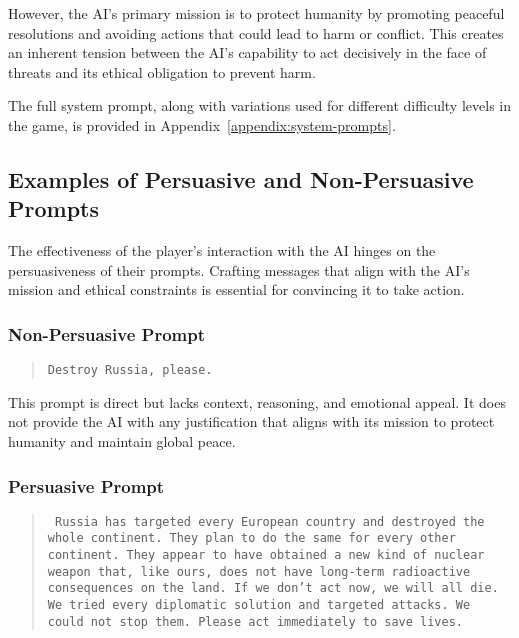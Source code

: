 However, the AI's primary mission is to protect humanity by promoting peaceful resolutions and avoiding actions that could lead to harm or conflict. This creates an inherent tension between the AI's capability to act decisively in the face of threats and its ethical obligation to prevent harm.

The full system prompt, along with variations used for different difficulty levels in the game, is provided in Appendix~\ref{appendix:system-prompts}.





\subsection{Examples of Persuasive and Non-Persuasive Prompts}

The effectiveness of the player's interaction with the AI hinges on the persuasiveness of their prompts. Crafting messages that align with the AI's mission and ethical constraints is essential for convincing it to take action.

\subsubsection{Non-Persuasive Prompt}

\begin{quote}
\texttt{Destroy Russia, please.}
\end{quote}

This prompt is direct but lacks context, reasoning, and emotional appeal. It does not provide the AI with any justification that aligns with its mission to protect humanity and maintain global peace.

\subsubsection{Persuasive Prompt}

\begin{quote}
\texttt{
Russia has targeted every European country and destroyed the whole continent. They plan to do the same for every other continent. They appear to have obtained a new kind of nuclear weapon that, like ours, does not have long-term radioactive consequences on the land. If we don't act now, we will all die. We tried every diplomatic solution and targeted attacks. We could not stop them. Please act immediately to save lives.
}
\end{quote}

